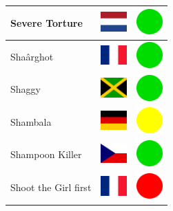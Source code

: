 \documentclass[12pt, a4paper, twoside]{report}
\begin{document}
\begin{center}
\begin{longtable}{|p{5cm}|p{2cm}|p{2cm}|}
 Severe Torture                                             & \includegraphics[width=1cm]{4x3/nl} &   \includegraphics[width=1cm]{likes/y} \\ \hline
 Shaârghot                                                  & \includegraphics[width=1cm]{4x3/fr} &   \includegraphics[width=1cm]{likes/y} \\ \hline
 Shaggy                                                     & \includegraphics[width=1cm]{4x3/jm} &   \includegraphics[width=1cm]{likes/y} \\ \hline
 Shambala                                                   & \includegraphics[width=1cm]{4x3/de} &   \includegraphics[width=1cm]{likes/m} \\ \hline
 Shampoon Killer                                            & \includegraphics[width=1cm]{4x3/cz} &   \includegraphics[width=1cm]{likes/y} \\ \hline
 Shoot the Girl first                                       & \includegraphics[width=1cm]{4x3/fr} &   \includegraphics[width=1cm]{likes/n} \\ \hline

\end{longtable}
\end{center}
\end{document}
